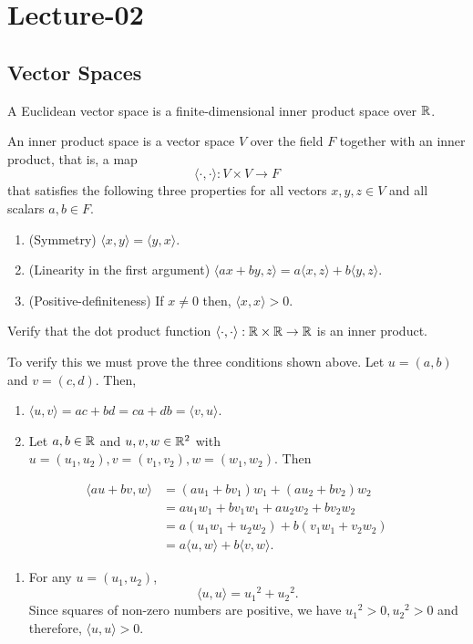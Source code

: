 \newpage
\section{Lecture-02}
\subsection{Vector Spaces}
\begin{definition}
	A Euclidean vector space is a finite-dimensional inner product space over $\mathbb{R}$.
\end{definition}

\begin{definition}
	An inner product space is a vector space $V$ over the field $F$ together with an inner product, that is, a map
	\[ \langle \cdot,\cdot \rangle : V \times V \to F\]
	that satisfies the following three properties for all vectors $x,y,z \in V$ and all scalars $a,b \in F$.
	\begin{enumerate}
		\item (Symmetry) $\langle x,y \rangle = \langle y,x \rangle$.
		\item (Linearity in the first argument)  $\langle ax + by,z \rangle = a \langle x,z \rangle + b \langle y,z \rangle$.

		\item (Positive-definiteness) If $x \neq 0$ then,  $\langle x,x \rangle  > 0$.
	\end{enumerate}
\end{definition}

\begin{example}
	Verify that the dot product function $\langle \cdot, \cdot \rangle : \mathbb{R} \times \mathbb{R} \to \mathbb{R}$ is an inner product.

	To verify this we must prove the three conditions shown above. Let $u = (a,b)$ and  $v = (c,d)$. Then,
	\begin{enumerate}
		\item $\langle u, v \rangle = ac + bd = ca + db = \langle v,u \rangle.$
		\item Let $a,b \in \mathbb{R}$ and $u,v,w \in \mathbb{R}^2$ with $u = (u_1,u_2), v = (v_1,v_2), w = (w_1,w_2)$. Then

	\end{enumerate}
	\begin{align*}
		\langle au + bv, w \rangle & = (au_1 + bv_1) w_1 + (au_2+bv_2) w_2            \\
		                           & = au_1w_1 + bv_1w_1 + au_2w_2 + bv_2w_2          \\
		                           & = a(u_1w_1 + u_2w_2) + b(v_1w_1 + v_2w_2)        \\
		                           & = a \langle u,w \rangle + b \langle v,w \rangle.
	\end{align*}
	\begin{enumerate}
		\item[3.] For any $u = (u_1,u_2)$,
		      \[ \langle u, u \rangle = {u_1}^2 + {u_2}^2.\]
		      Since squares of non-zero numbers are positive, we have  ${u_1}^2 >0, {u_2}^2 > 0$ and therefore,  $\langle u,u \rangle > 0$.
	\end{enumerate}
\end{example}

